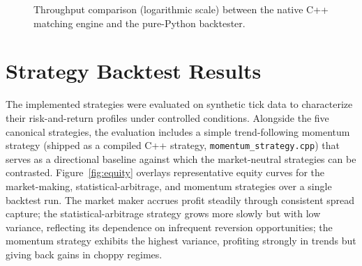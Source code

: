 \documentclass[12pt,oneside,a4paper]{report}
\begin{document}
\begin{figure}[H]
\centering
{}
\caption[Throughput comparison (C++ matching vs. Python backtester)]{Throughput comparison (logarithmic scale) between the native C++ matching engine and the pure-Python backtester.}
\label{fig:throughput}
\end{figure}

\section{Strategy Backtest Results}
\label{sec:results}

The implemented strategies were evaluated on synthetic tick data to characterize their risk-and-return profiles under controlled conditions. Alongside the five canonical strategies, the evaluation includes a simple trend-following momentum strategy (shipped as a compiled C++ strategy, \texttt{momentum\_strategy.cpp}) that serves as a directional baseline against which the market-neutral strategies can be contrasted. Figure~\ref{fig:equity} overlays representative equity curves for the market-making, statistical-arbitrage, and momentum strategies over a single backtest run. The market maker accrues profit steadily through consistent spread capture; the statistical-arbitrage strategy grows more slowly but with low variance, reflecting its dependence on infrequent reversion opportunities; the momentum strategy exhibits the highest variance, profiting strongly in trends but giving back gains in choppy regimes.
\end{document}
